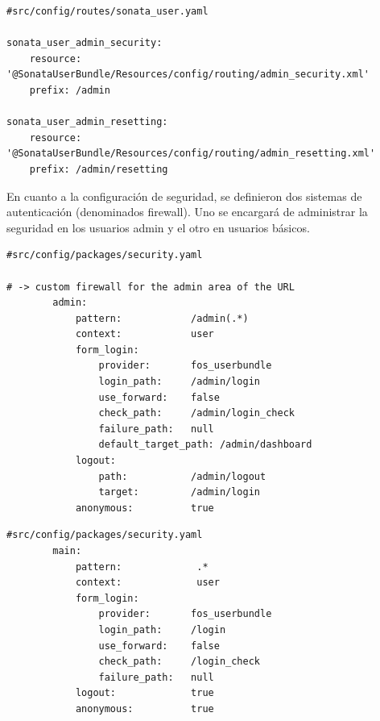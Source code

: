 \begin{lstlisting}[caption={archivo de configuración de rutas de sonata-user\\Fuente: \sonatainstallation.}]
#src/config/routes/sonata_user.yaml

sonata_user_admin_security:
    resource: '@SonataUserBundle/Resources/config/routing/admin_security.xml'
    prefix: /admin

sonata_user_admin_resetting:
    resource: '@SonataUserBundle/Resources/config/routing/admin_resetting.xml'
    prefix: /admin/resetting

\end{lstlisting}


En cuanto a la configuración de seguridad, se definieron dos sistemas de autenticación (denominados firewall)\@. Uno se encargará de administrar la seguridad en
los usuarios admin y el otro en usuarios básicos.

\begin{lstlisting}[caption={Firewall para el área admin del sistema.\\Fuente: \sonatainstallation.}]
#src/config/packages/security.yaml

# -> custom firewall for the admin area of the URL
        admin:
            pattern:            /admin(.*)
            context:            user
            form_login:
                provider:       fos_userbundle
                login_path:     /admin/login
                use_forward:    false
                check_path:     /admin/login_check
                failure_path:   null
                default_target_path: /admin/dashboard
            logout:
                path:           /admin/logout
                target:         /admin/login
            anonymous:          true
\end{lstlisting}

\newpage
\begin{lstlisting}[caption={Firewall para el área de registro y login de usuarios básicos.\\Fuente: \sonatainstallation.}]
#src/config/packages/security.yaml
        main:
            pattern:             .*
            context:             user
            form_login:
                provider:       fos_userbundle
                login_path:     /login
                use_forward:    false
                check_path:     /login_check
                failure_path:   null
            logout:             true
            anonymous:          true
\end{lstlisting}

